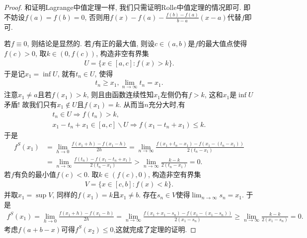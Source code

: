 \documentclass[../../main.tex]{subfiles}%
\begin{document}
\begin{proof}

和证明Lagrange中值定理一样, 我们只需证明Rolle中值定理的情况即可. 即不妨设$f(a) = f(b) = 0$, 否则用$f(x) - f(a) - \frac{f(b)-f(a)}{b - a}(x - a)$代替$f$即可.

若$f \equiv 0$, 则结论是显然的. 若$f$有正的最大值, 则设$c \in (a,b)$是$f$的最大值点使得$f(c) > 0$, 取$k \in (0,f(c))$, 构造非空有界集
\begin{align*}
U = \{x \in [a,c] : f(x) > k\}.
\end{align*}
于是记$x_1 = \inf U$, 就有$t_n \in U$, 使得
\begin{align*}
t_n \geqslant x_1, \lim_{n \to \infty} t_n = x_1.
\end{align*}
注意$x_1 \neq a$且若$f(x_1) > k$, 则且由函数连续性知$x_1$左侧仍有$f > k$, 这和$x_1$是$\inf U$矛盾! 故我们只有$x_1 \notin U$且$f(x_1) = k$.
从而当$n$充分大时,有
\begin{gather*}
t_n\in U\Longrightarrow f\left( t_n \right) >k,
\\
x_1-t_n+x_1\in \left[ a,c \right] \backslash U\Longrightarrow f\left( x_1-t_n+x_1 \right) \leqslant k.
\end{gather*}
于是
\begin{align*}
f^S(x_1)&=\lim_{h\rightarrow 0} \frac{f\left( x_1+h \right) -f\left( x_1-h \right)}{2h}=\lim_{n\rightarrow \infty} \frac{f\left( x_1+t_n-x_1 \right) -f\left( x_1-\left( t_n-x_1 \right) \right)}{2\left( t_n-x_1 \right)}
\\
&=\lim_{n\rightarrow \infty} \frac{f\left( t_n \right) -f\left( x_1-t_n+x_1 \right)}{2\left( t_n-x_1 \right)}>\lim_{n\rightarrow \infty} \frac{k-k}{2\left( t_n-x_1 \right)}=0.
\end{align*}
若$f$有负的最小值$f(c) < 0$. 取$k \in (f(c),0)$, 构造非空有界集
\begin{align*}
V = \{x \in [c,b] : f(x) < k\}.
\end{align*}
并取$x_1 = \sup V$, 同样的$f(x_1) = k$且$x_1 \neq b$. 存在$s_n \in V$使得$\lim_{n \to \infty} s_n = x_1$. 于是
\begin{align*}
f^S(x_1) = \lim_{h \to 0} \frac{f(x_1 + h) - f(x_1 - h)}{2h} = \lim_{n \to \infty} \frac{f(x_1 + x_1 - s_n) - f(x_1 - (x_1 - s_n))}{2(x_1 - s_n)} \geqslant \lim_{n \to \infty} \frac{k - k}{2(x_1 - s_n)} = 0.
\end{align*}
考虑$f(a + b - x)$可得$f^S(x_2)\leqslant 0$,这就完成了定理的证明.
\end{proof}
\end{document}
